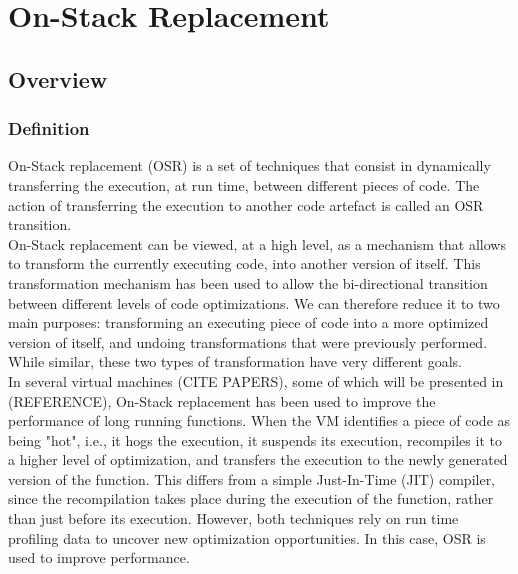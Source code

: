 
\chapter{On-Stack Replacement} %

\label{Chapter2} %


\newcommand{\keyword}[1]{\textbf{#1}}
\newcommand{\tabhead}[1]{\textbf{#1}}
\newcommand{\code}[1]{\texttt{#1}}
\newcommand{\file}[1]{\texttt{\bfseries#1}}
\newcommand{\option}[1]{\texttt{\itshape#1}}

\section{Overview}
\subsection{Definition}
On-Stack replacement (OSR) is a set of techniques that consist in dynamically transferring the execution, at run time, between different pieces of code.
The action of transferring the execution to another code artefact is called an OSR transition.\\

On-Stack replacement can be viewed, at a high level, as a mechanism that allows to transform the currently executing code, into another version of itself.
This transformation mechanism has been used to allow the bi-directional transition between different levels of code optimizations.
We can therefore reduce it to two main purposes: transforming an executing piece of code into a more optimized version of itself, and undoing transformations that were previously performed.
While similar, these two types of transformation have very different goals.\\

In several virtual machines (CITE PAPERS), some of which will be presented in (REFERENCE), On-Stack replacement has been used to improve the performance of long running functions.
When the VM identifies a piece of code as being "hot", i.e., it hogs the execution, it suspends its execution, recompiles it to a higher level of optimization, and transfers the execution to the newly generated version of the function.
This differs from a simple Just-In-Time (JIT) compiler, since the recompilation takes place during the execution of the function, rather than just before its execution.
However, both techniques rely on run time profiling data to uncover new optimization opportunities.
In this case, OSR is used to improve performance.\\

